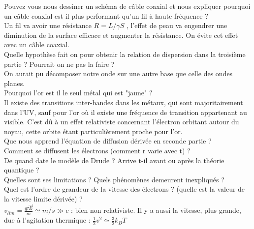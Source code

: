 \documentclass[12pt,prb,aps,epsf]{article}
\begin{document}
Pouvez vous nous dessiner un schéma de câble coaxial et nous expliquer pourquoi un câble coaxial est il plus performant qu'un fil à haute fréquence ?\\
Un fil va avoir une résistance $R= L/\gamma S$ , l'effet de peau va engendrer une diminution de la surface efficace et augmenter la résistance. On évite cet effet avec un câble coaxial.\\

Quelle hypothèse fait on pour obtenir la relation de dispersion dans la troisième partie ? Pourrait on ne pas la faire ?\\
On aurait pu décomposer notre onde sur une autre base que celle des ondes planes.\\ 

Pourquoi l'or est il le seul métal qui est "jaune" ?\\
Il existe des transitions inter-bandes dans les métaux, qui sont majoritairement dans l'UV, sauf pour l'or où il existe une fréquence de transition appartenant au visible. C'est dû à un effet relativiste concernant l'électron orbitant autour du noyau, cette orbite étant particulièrement proche pour l'or.\\

Que nous apprend l'équation de diffusion dérivée en seconde partie ?\\

Comment se diffusent les électrons (comment r varie avec t) ?\\

De quand date le modèle de Drude ? Arrive t-il avant ou après la théorie quantique ?\\

Quelles sont ses limitations ? Quels phénomènes demeurent inexpliqués ?\\

Quel est l'ordre de grandeur de la vitesse des électrons ? (quelle est la valeur de la vitesse limite dérivée) ?\\
$v_{lim} = \frac{q\tau \vec{E}}{m} \simeq m/s \gg c$ : bien non relativiste. Il y a aussi la vitesse, plus grande, due à l'agitation thermique : $\frac{1}{2}v^2 \simeq \frac{3}{2}k_BT$
\end{document}
